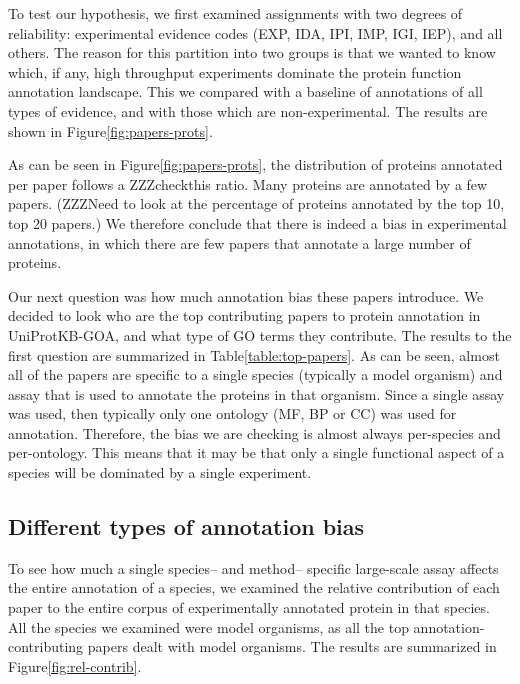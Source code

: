\documentclass[10pt]{bmc_article}
\newenvironment{bmcformat}{\begin{raggedright}\baselineskip20pt\sloppy\setboolean{publ}{false}}{\end{raggedright}\baselineskip20pt\sloppy}
\begin{document}
\begin{bmcformat}
To test our hypothesis, we first examined assignments with two degrees of reliability:
experimental evidence codes (EXP, IDA, IPI, IMP, IGI, IEP), and all others. The
reason for this partition into two groups is that we wanted to know which, if
any, high throughput experiments dominate the protein function annotation
landscape. This we compared with a baseline of annotations of all types of
evidence, and with those which are non-experimental. The results are shown in
Figure\ref{fig:papers-prots}.

As can be seen in Figure\ref{fig:papers-prots}, the distribution of proteins
annotated per paper follows a  ZZZcheckthis ratio.  Many proteins are annotated by a
few papers. (ZZZNeed to look at the percentage of proteins annotated by the top
10, top 20 papers.) We therefore conclude that there is indeed a bias in
experimental annotations, in which there are few papers that annotate a large
number of proteins.

Our next question was how much annotation bias these papers introduce. We
decided to look who are the top contributing papers to protein annotation in
UniProtKB-GOA, and what type of GO terms they contribute.  The results to the
first question are summarized in Table\ref{table:top-papers}.  As can be seen,
almost all of the papers are specific to a single species (typically a model
organism) and assay that is used to annotate the proteins in that organism.
Since a single assay was used, then typically only one ontology (MF, BP or CC)
was used for annotation. Therefore, the bias we are checking is almost always per-species
and per-ontology.  This means that it may be that only a single functional
aspect of a species will be dominated by a single experiment.
 
\subsection*{Different types of annotation bias}
To see how much a single species-- and method-- specific large-scale assay
affects the entire annotation of a species, we examined the relative contribution
of each paper to the entire corpus of experimentally annotated protein in that species.
All the species we examined were model organisms, as all the top annotation-contributing papers
dealt with model organisms. 
The results are summarized in Figure\ref{fig:rel-contrib}.



\end{bmcformat}
\end{document}
